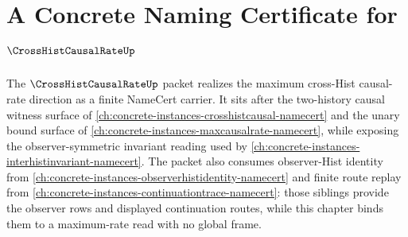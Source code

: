 \chapter{A Concrete Naming Certificate for $\CrossHistCausalRateUp$}
\label{ch:concrete-instances-crosshistcausalrate-namecert}

The $\CrossHistCausalRateUp$ packet realizes the maximum cross-Hist causal-rate direction as a finite NameCert carrier. It sits after the two-history causal witness surface of \autoref{ch:concrete-instances-crosshistcausal-namecert} and the unary bound surface of \autoref{ch:concrete-instances-maxcausalrate-namecert}, while exposing the observer-symmetric invariant reading used by \autoref{ch:concrete-instances-interhistinvariant-namecert}. The packet also consumes observer-Hist identity from \autoref{ch:concrete-instances-observerhistidentity-namecert} and finite route replay from \autoref{ch:concrete-instances-continuationtrace-namecert}: those siblings provide the observer rows and displayed continuation routes, while this chapter binds them to a maximum-rate read with no global frame.

